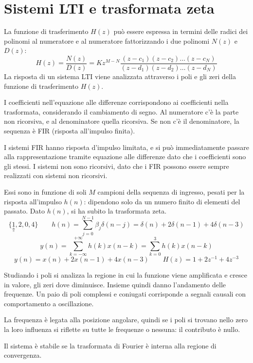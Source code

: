 \section{Sistemi LTI e trasformata zeta}
La funzione di trasferimento $H(z)$ può essere espressa in termini delle radici dei polinomi al numeratore e al numeratore fattorizzando i due polinomi $N(z)$ e $D(z)$:
$$H(z) = \frac{N(z)}{D(z)} = Kz^{M-N} \frac{(z-c_1)(z-c_2) \dots (z-c_N)}{(z-d_1)(z-d_2)\dots(z-d_N)}$$
La risposta di un sistema LTI viene analizzata attraverso i poli e gli zeri della funzione di trasferimento $H(z)$.

I coefficienti nell'equazione alle differenze corrispondono ai coefficienti nella trasformata, considerando il cambiamento di segno. Al numeratore c'è la parte non ricorsiva, e al denominatore quella ricorsiva. Se non c'è il denominatore, la sequenza è FIR (risposta all'impulso finita).

I sistemi FIR hanno risposta d'impulso limitata, e si può immediatamente passare alla rappresentazione tramite equazione alle differenze dato che i coefficienti sono gli stessi. I sistemi non sono ricorsivi, dato che i FIR possono essere sempre realizzati con sistemi non ricorsivi.

Essi sono in funzione di soli $M$ campioni della sequenza di ingresso, pesati per la risposta all'impulso $h(n)$: dipendono solo da un numero finito di elementi del passato. Dato $h(n)$, si ha subito la trasformata zeta.
$$\{\underset{\Uparrow}1, 2, 0, 4\} \qquad h(n) = \sum_{j=0}^{N-1}\beta_j\delta(n - j) = \delta(n) + 2\delta(n - 1) + 4\delta(n - 3)$$
$$y(n) = \sum_{k=-\infty}^{+\infty} h(k)x(n-k) = \sum_{k=0}^{3}h(k)x(n-k)$$
$$y(n) = x(n) + 2x(n-1) + 4x(n-3) \qquad H(z) = 1+2z^{-1} + 4z^{-3}$$

Studiando i poli si analizza la regione in cui la funzione viene amplificata e cresce in valore, gli zeri dove diminuisce. Insieme quindi danno l'andamento delle frequenze. Un paio di poli complessi e coniugati corrisponde a segnali causali con comportamento a oscillazione.

La frequenza è legata alla posizione angolare, quindi se i poli si trovano nello zero la loro influenza si riflette su tutte le frequenze o nessuna: il contributo è nullo.

Il sistema è stabile se la trasformata di Fourier è interna alla regione di convergenza. 

